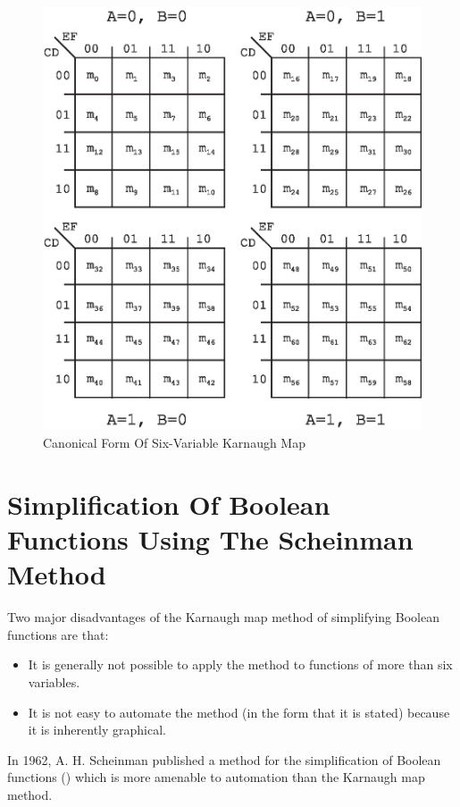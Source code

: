 \begin{figure}
\centering
\includegraphics[width=4.5in]{c_bal0/kmap06cf.eps}
\caption{Canonical Form Of Six-Variable Karnaugh Map}
\label{fig:cbal0:skm0:04}
\end{figure}

\section[Simplification Using The Scheinman Method]
        {Simplification Of Boolean Functions Using The Scheinman Method}
\label{cbal0:sscm0}

Two major disadvantages of the Karnaugh map method of simplifying Boolean
functions are that:

\begin{itemize}
\item It is generally not possible to apply the method to functions
      of more than six variables.
\item It is not easy to automate the method (in the form that it is stated)
      because it is inherently graphical.
\end{itemize}

In 1962, A. H. Scheinman published a method for the simplification
of Boolean functions (\cite{bibref:p:scheinmanclassic01}) which is more amenable
to automation than the Karnaugh map method.

